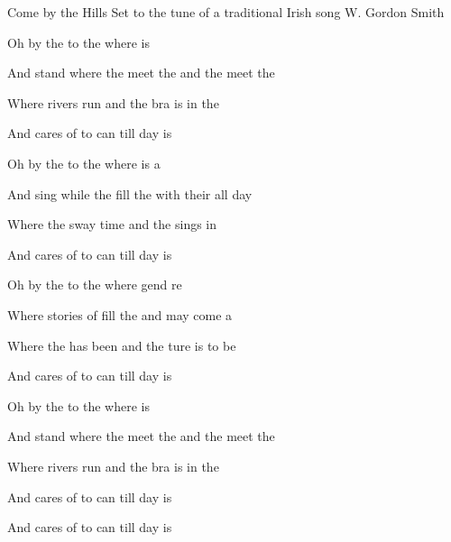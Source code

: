 \begin{SBSong}{Come by the Hills}
  {Set to the tune of a traditional Irish song}
  {W. Gordon Smith}
  
  
  \begin{SBVerse}
   Oh  by the  to the  where  is 

   And stand where the  meet the  and the  meet the 

   Where  rivers run  and the bra is  in the 

   And  cares of to can  till  day is 
  \end{SBVerse}
  \begin{SBVerse}
   Oh  by the  to the  where  is a 

   And sing while the  fill the  with their  all day 

   Where the  sway  time and  the  sings in 

   And  cares of to can  till  day is 
  \end{SBVerse}
  \begin{SBVerse}
   Oh  by the  to the  where gend re

   Where stories of  fill the  and may  come a

   Where the  has been  and the ture is  to be 

   And  cares of to can  till  day is 
  \end{SBVerse}
  \begin{SBVerse}
   Oh  by the  to the  where  is 

   And stand where the  meet the  and the  meet the 

   Where  rivers run  and the bra is  in the 

   And  cares of to can  till  day is 

   And  cares of to can  till  day is   
  \end{SBVerse}
\end{SBSong}

